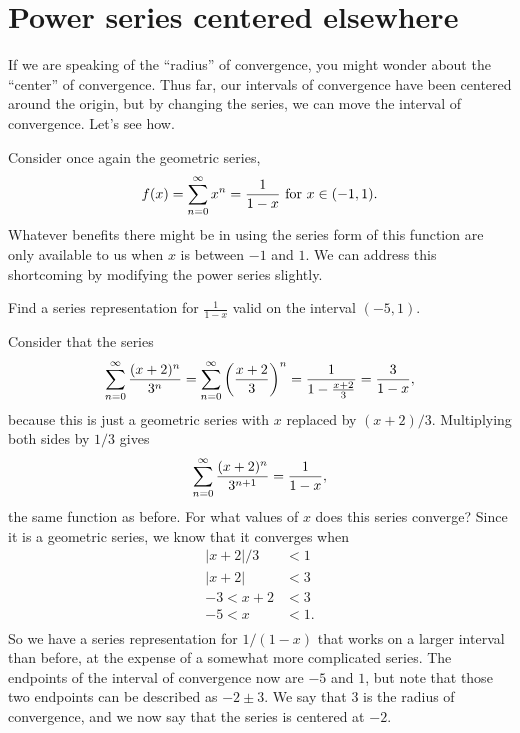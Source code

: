 \section{Power series centered elsewhere}
\label{section:power-series-centered-around-a}

If we are speaking of the ``radius'' of convergence, you might wonder
about the ``center'' of convergence.  Thus far, our intervals of
convergence have been centered around the origin, but by changing the
series, we can move the interval of convergence.  Let's see how.

Consider once again the geometric series,
$$
f(x) = \sum_{n=0}^\infty x^n={1\over 1-x} \mbox{ for $x \in (-1,1)$.}
$$
Whatever benefits there might be in using the series form of this
function are only available to us when $x$ is between $-1$ and
$1$.  We can address this shortcoming by modifying the power
series slightly.

\begin{example}
\label{example:one-over-one-minus-x-on-different-interval}
Find a series representation for $\frac{1}{1-x}$ valid on the interval $(-5,1)$.
\end{example}

\begin{solution}
Consider that the series
$$
  \sum_{n=0}^\infty {(x+2)^n\over 3^n}=
  \sum_{n=0}^\infty \left({x+2\over 3}\right)^n={1\over 1-{x+2\over 3}}=
  {3\over 1-x},
$$
because this is just a geometric series with $x$ replaced by
$(x+2)/3$. Multiplying both sides by $1/3$
gives %
$$\sum_{n=0}^\infty {(x+2)^n\over 3^{n+1}}={1\over 1-x},$$
the same function as before. For what values of $x$ does this series
converge? Since it is a geometric series, we know that it converges
when 
\begin{align*}
  |x+2|/3&<1 \\
  |x+2|&<3 \\
  -3 < x+2 &< 3 \\
  -5<x&<1. \\
\end{align*}
So we have a series representation for $1/(1-x)$ that works on a
larger interval than before, at the expense of a somewhat more
complicated series. The endpoints of the interval of convergence now
are $-5$ and $1$, but note that those two endpoints can be described
as $-2\pm3$. We say that $3$ is the radius of convergence, and we now
say that the series is centered at $-2$.
\end{solution}

